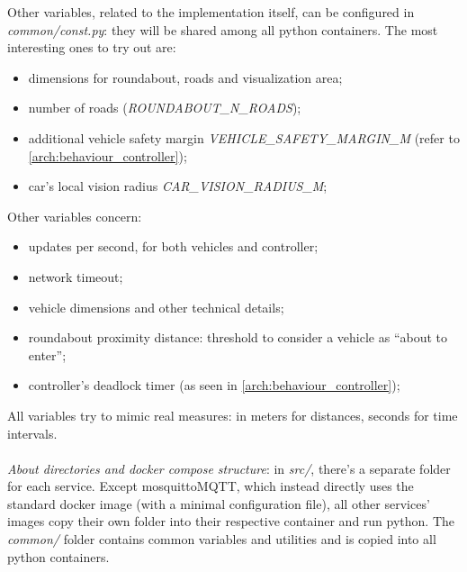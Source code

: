 Other variables, related to the implementation itself, can be configured in
\textit{common/const.py}: they will be shared among all python containers. The
most interesting ones to try out are:
\begin{itemize}
  \item dimensions for roundabout, roads and visualization area;
  \item number of roads (\textit{ROUNDABOUT\_N\_ROADS});
  \item additional vehicle safety margin \textit{VEHICLE\_SAFETY\_MARGIN\_M} (refer to
  \ref{arch:behaviour_controller});
  \item car's local vision radius \textit{CAR\_VISION\_RADIUS\_M};
\end{itemize}

Other variables concern:
\begin{itemize}
  \item updates per second, for both vehicles and controller;
  \item network timeout;
  \item vehicle dimensions and other technical details;
  \item roundabout proximity distance: threshold to consider a vehicle as
  ``about to enter'';
  \item controller's deadlock timer (as seen in
  \ref{arch:behaviour_controller});
\end{itemize}

All variables try to mimic real measures: in meters for distances, seconds for
time intervals.
\\
\\
\textit{About directories and docker compose structure}: in \textit{src/},
there's a separate folder for each service. Except mosquittoMQTT, which instead
directly uses the standard docker image (with a minimal configuration file), all
other services' images copy their own folder into their respective container and
run python. The \textit{common/} folder contains common variables and utilities
and is copied into all python containers.
